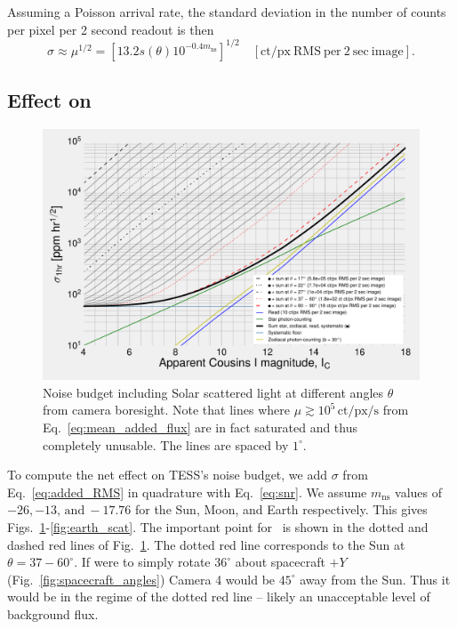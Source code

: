 Assuming a Poisson arrival rate, the standard deviation in the number of counts 
per pixel per 2 second readout is then
\begin{equation}
\sigma \approx \mu^{1/2} = \left[ 13.2 s(\theta) 10^{-0.4 m_\mathrm{ns}} 
\right]^{1/2}\quad \mathrm{[ct/px\ RMS\ per\ 2\ sec\ image]}.
\label{eq:added_RMS}
\end{equation}

\subsection{Effect on  {\rm \npole}}
\label{sec:scattered_npole}
\begin{figure}[!t]
	\centering
	\includegraphics{figures/precision_angles_sun.pdf}
	\caption{Noise budget including Solar scattered light at different angles 
		$\theta$ from camera boresight. Note that lines where $\mu \gtrsim 
		10^5\,\mathrm{ct/px/s}$ from Eq.~\protect\ref{eq:mean_added_flux} are 
		in 
		fact 
		saturated and thus completely unusable. The lines are spaced by 
		$1^\circ$.} 
	\label{fig:sun_scat}
\end{figure}
To compute the net effect on TESS's noise budget, we add $\sigma$ from 
Eq.~\ref{eq:added_RMS} in quadrature with Eq.~\ref{eq:snr}.
We assume $m_\mathrm{ns}$ values of $-26,-13,\,\mathrm{and}\ -17.76$ for the 
Sun, Moon, and Earth respectively.
This gives Figs.~\ref{fig:sun_scat}-\ref{fig:earth_scat}.
The important point for \npole\ is shown in the dotted and dashed red lines of 
Fig.~\ref{fig:sun_scat}. 
The dotted red line corresponds to the Sun at $\theta=37-60^\circ$.
If \tess were to simply rotate $36^\circ$ about spacecraft $+Y$ 
(Fig.~\ref{fig:spacecraft_angles}) Camera 4 would be $45^\circ$
away from the Sun.
Thus it would be in the regime of the dotted red line -- likely an unacceptable 
level of background flux.

